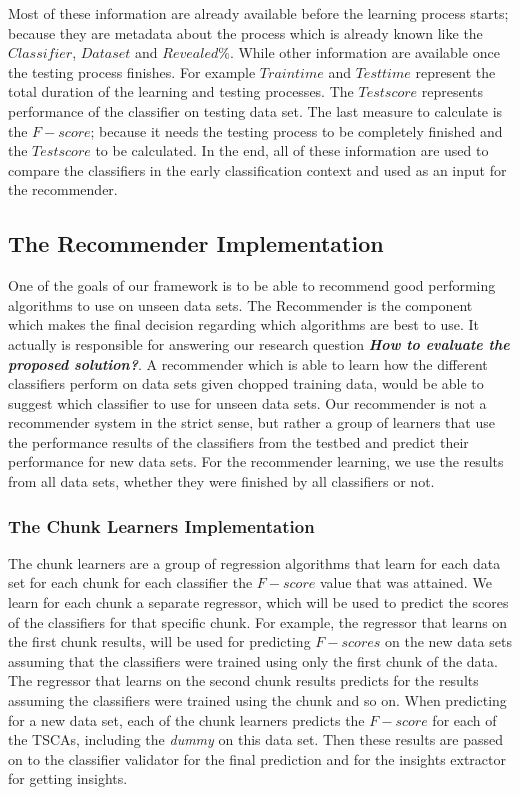 Most of these information are already available before the learning process starts; because they are metadata about the process which is already known like the $Classifier$, $Data set$ and $Revealed \%$.
While other information are available once the testing process finishes. For example $Train time$ and $Test time$ represent the total duration of the learning and testing processes.
The $Test score$ represents performance of the classifier on testing data set.
The last measure to calculate is the $F-score$; because it needs the testing process to be completely finished and the $Test score$ to be calculated.
In the end, all of these information are used to compare the classifiers in the early classification context and used as an input for the recommender.

\subsection{The Recommender Implementation}
\label{SubsectionRecommenderImplementation}
One of the goals of our framework is to be able to recommend good performing algorithms to use on unseen data sets.
The Recommender is the component which makes the final decision regarding which algorithms are best to use.
It actually is responsible for answering our research question \textbf{\textit{How to evaluate the proposed solution?}}.
A recommender which is able to learn how the different classifiers perform on data sets given chopped training data,
would be able to suggest which classifier to use for unseen data sets.
Our recommender is not a recommender system in the strict sense, but rather a group of learners that use the performance results of the classifiers from the testbed
and predict their performance for new data sets. For the recommender learning, we use the results from all data sets, whether they were finished by all classifiers or not.

\subsubsection*{The Chunk Learners Implementation}
\label{ChunkLearnersImplementation}
The chunk learners are a group of regression algorithms that learn for each data set for each chunk for each classifier the $F-score$ value that was attained.
We learn for each chunk a separate regressor, which will be used to predict the scores of the classifiers for that specific chunk.
For example, the regressor that learns on the first chunk results, will be used for predicting $F-scores$ on the new data sets assuming that the classifiers were trained using only the first chunk of the data.
The regressor that learns on the second chunk results predicts for the results assuming the classifiers were trained using the  chunk and so on.
When predicting for a new data set, each of the chunk learners predicts the $F-score$ for each of the TSCAs, including the \emph{dummy} on this data set.
Then these results are passed on to the classifier validator for the final prediction and for the insights extractor for getting insights.

